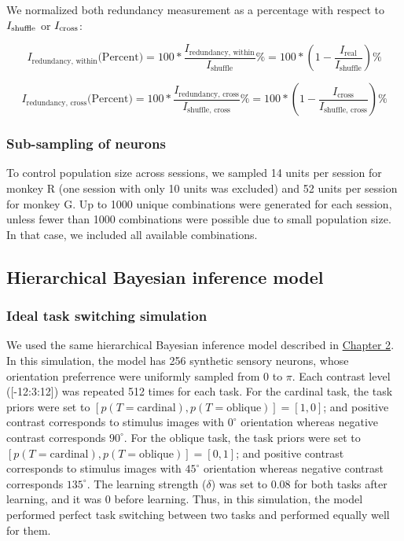 \documentclass[lineno,pdflatex,sn-basic]{sn-jnl}%
\newcommand{\Is}{I_{\rm shuffle}}
\newcommand{\Icross}{I_{\rm cross}}
\theoremstyle{thmstyleone}%
\theoremstyle{thmstyletwo}%
\theoremstyle{thmstylethree}%
\begin{document}
We normalized both redundancy measurement as a percentage with respect to $\Is$ or $\Icross$:

\[ I_\textrm{redundancy, within} \textrm{(Percent)} = 100 * \frac{I_\textrm{redundancy, within}}{I_\textrm{shuffle}}\%  = 100 * (1 - \frac{I_\textrm{real}}{I_\textrm{shuffle}})\%\]

\[ I_\textrm{redundancy, cross} \textrm{(Percent)} = 100 * \frac{I_\textrm{redundancy, cross}}{I_\textrm{shuffle, cross}}\%  = 100 * (1 - \frac{I_\textrm{cross}}{I_\textrm{shuffle, cross}})\%\]



\subsubsection{Sub-sampling of neurons} To control population size across sessions, we sampled 14 units per session for monkey R (one session with only 10 units was excluded) and 52 units per session for monkey G. Up to 1000 unique combinations were generated for each session, unless fewer than 1000 combinations were possible due to small population size. In that case, we included all available combinations. 


\subsection{Hierarchical Bayesian inference model}
\subsubsection{Ideal task switching simulation} \label{sec_ch2:ideal_simulation}
We used the same hierarchical Bayesian inference model described in \hyperref[sec_ch1:Hierarchical Bayesian inference model]{Chapter 2}. In this simulation, the model has 256 synthetic sensory neurons, whose orientation preferrence were uniformly sampled from 0 to $\pi$. Each contrast level ([-12:3:12]) was repeated 512 times for each task. For the cardinal task, the task priors were set to $[p(T = \textrm{cardinal}), p(T = \textrm{oblique})] = [1,0]$; and positive contrast corresponds to stimulus images with $0^\circ$ orientation whereas negative contrast corresponds $90^\circ$. For the oblique task, the task priors were set to $[p(T = \textrm{cardinal}), p(T = \textrm{oblique})] = [0,1]$; and positive contrast corresponds to stimulus images with $45^\circ$ orientation whereas negative contrast corresponds $135^\circ$. The learning strength ($\delta$) was set to 0.08 for both tasks after learning, and it was 0 before learning. Thus, in this simulation, the model performed perfect task switching between two tasks and performed equally well for them.
\end{document}
